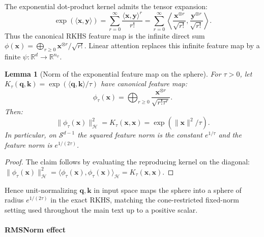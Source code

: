 \documentclass{article}
\newcommand{\1}{\bm{1}}
\newcommand{\norm}[1]{\lVert {#1} \rVert}
\newcommand{\lrangle}[1]{\langle#1\rangle}
\newcommand{\sphere}[1]{\gS^{#1}}
\def\vk{{\bm{k}}}
\def\vq{{\bm{q}}}
\def\vx{{\bm{x}}}
\def\vy{{\bm{y}}}
\def\gH{{\mathcal{H}}}
\def\gS{{\mathcal{S}}}
\newcommand{\R}{\mathbb{R}}
\newtheorem{lemma}[theorem]{Lemma}
\theoremstyle{definition}
\begin{document}
The exponential dot-product kernel admits the tensor expansion:
\begin{equation}
  \exp(\lrangle{\vx,\vy})
  = \sum_{r=0}^{\infty}\frac{\lrangle{\vx,\vy}^r}{r!}
  = \sum_{r=0}^{\infty}
  \left\langle \frac{\vx^{\otimes r}}{\sqrt{r!}},
  \frac{\vy^{\otimes r}}{\sqrt{r!}}\right\rangle .
\end{equation}
Thus the canonical RKHS feature map is the infinite direct sum
$\phi(\vx)=\bigoplus_{r\ge 0}\vx^{\otimes r}/\sqrt{r!}$. Linear attention replaces this infinite
feature map by a finite $\psi:\R^d\to\R^{n_\psi}$.

\begin{lemma}[Norm of the exponential feature map on the sphere]
  \label{lem:exp-norm}
  For $\tau>0$, let
  $K_\tau(\vq,\vk)=\exp(\lrangle{\vq,\vk}/\tau)$ have canonical feature map:
  \[
    \phi_\tau(\vx)
      =\bigoplus_{r\ge0}\frac{\vx^{\otimes r}}{\sqrt{r!\tau^r}}.
  \]
  Then:
  \[
    \norm{\phi_\tau(\vx)}_\gH^2
      =K_\tau(\vx,\vx)
      =\exp(\norm{\vx}^2/\tau).
  \]
  In particular, on $\sphere{d-1}$ the squared feature norm is the constant $e^{1/\tau}$
  and the feature norm is $e^{1/(2\tau)}$.
\end{lemma}
\begin{proof}
  The claim follows by evaluating the reproducing kernel on the diagonal:
  $\norm{\phi_\tau(\vx)}_\gH^2
   =\lrangle{\phi_\tau(\vx),\phi_\tau(\vx)}_\gH
   =K_\tau(\vx,\vx)$.
\end{proof}

Hence unit-normalizing $\vq,\vk$ in input space maps the sphere into a sphere of radius
$e^{1/(2\tau)}$ in the exact RKHS, matching the cone-restricted fixed-norm setting used throughout
the main text up to a positive scalar.


\paragraph{RMSNorm effect}
\label{app:rms-temperature}
\end{document}
